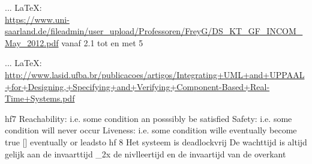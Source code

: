 \begin{thebibliography}{99}
{{{{{{%




 ... \LaTeX:\\ \url{https://www.uni-saarland.de/fileadmin/user_upload/Professoren/FreyG/DS_KT_GF_INCOM_May_2012.pdf}
vanaf 2.1 tot en met 5

 ... \LaTeX:\\ \url{http://www.lasid.ufba.br/publicacoes/artigos/Integrating+UML+and+UPPAAL+for+Designing,+Specifying+and+Verifying+Component-Based+Real-Time+Systems.pdf}

hf7
Reachability: i.e. some condition an posssibly be satisfied
Safety: i.e. some condition will never occur
Liveness: i.e. some condition wille eventually become true [] eventually or leadsto
hf 8
Het systeem is deadlockvrij
De wachttijd is altijd gelijk aan de invaarttijd _2x de nivlleertijd en de invaartijd van de overkant

}}}}}}
\end{thebibliography}
